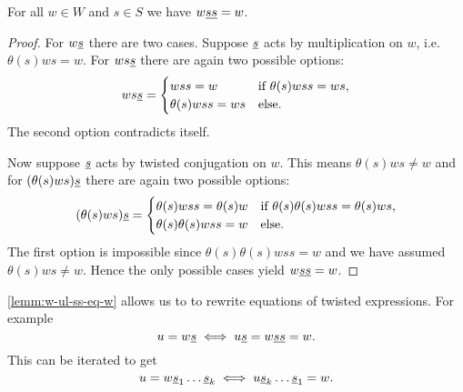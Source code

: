 \begin{lemm}
	For all $w \in W$ and $s \in S$ we have $w \underline{s} \underline{s} = w$.

	\begin{proof}
		For $w \underline{s}$ there are two cases. Suppose $\underline{s}$ acts by multiplication on $w$, i.e. $\theta(s)ws = w$. For $ws \underline{s}$ there are again two possible options:
		$$ ws \underline{s} = \begin{cases}
			wss = w & \textrm{if } \theta(s)wss = ws, \\
			\theta(s)wss = ws & \textrm{else}. \\
		\end{cases} $$
		The second option contradicts itself.

		Now suppose $\underline{s}$ acts by twisted conjugation on $w$. This means $\theta(s)ws \neq w$ and for $(\theta(s)ws) \underline{s}$ there are again two possible options:
		$$ (\theta(s)ws) \underline{s} = \begin{cases}
			\theta(s)wss = \theta(s)w & \textrm{if } \theta(s) \theta(s) w ss = \theta(s) w s, \\
			\theta(s)\theta(s)wss = w & \textrm{else}. \\
		\end{cases} $$
		The first option is impossible since $\theta(s) \theta(s) w ss = w$ and we have assumed $\theta(s)ws \neq w$. Hence the only possible cases yield $w \underline{s} \underline{s} = w$.
	\end{proof}
\end{lemm}

\begin{rema}
	\ref{lemm:w-ul-ss-eq-w} allows us to to rewrite equations of twisted expressions. For example
	$$ u = w \underline{s} \iff u \underline{s} = w \underline{s} \underline{s} = w. $$
	This can be iterated to get
	$$ u = w \underline{s}_1 \ldots \underline{s}_k \iff u \underline{s}_k \ldots \underline{s}_1 = w. $$
\end{rema}

